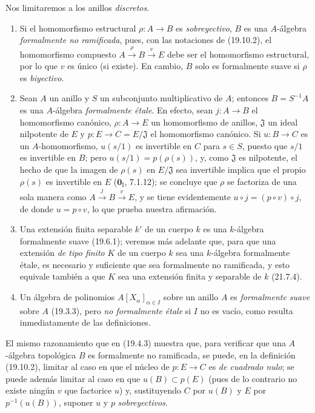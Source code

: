 
\begin{examples}[19.10.3]
\label{0.19.10.3-fr}
Nos limitaremos a los anillos \emph{discretos}.
\begin{enumerate}
  \item[(i)] Si el homomorfismo estructural $\rho:A\to B$ es
  \emph{sobreyectivo}, $B$ es una $A$-álgebra \emph{formalmente no ramificada},
  pues, con las notaciones de (19.10.2), el homomorfismo compuesto
  $A\xrightarrow{\rho}B\xrightarrow{v}E$ debe ser el homomorfismo estructural,
  por lo que $v$ es único (si existe). En cambio, $B$ solo es formalmente suave si $\rho$ es \emph{biyectivo}.
  \item[(ii)] Sean $A$ un anillo y $S$ un subconjunto multiplicativo de $A$;
  entonces $B=S^{-1}A$ es una $A$-álgebra \emph{formalmente étale}. En efecto,
  sean $j:A\to B$ el homomorfismo canónico, $\rho:A\to E$ un homomorfismo de
  anillos, $\mathfrak J$ un ideal nilpotente de $E$ y
  $p:E\to C=E/\mathfrak J$ el homomorfismo canónico. Si $u:B\to C$ es un
  $A$-homomorfismo, $u(s/1)$ es invertible en $C$ para $s\in S$, puesto que
  $s/1$ es invertible en $B$; pero $u(s/1)=p(\rho(s))$, y, como $\mathfrak J$
  es nilpotente, el hecho de que la imagen de $\rho(s)$ en $E/\mathfrak J$ sea
  invertible implica que el propio $\rho(s)$ es invertible en $E$
  ($\mathbf 0_{\mathrm I}$, 7.1.12); se concluye que $\rho$ se factoriza de una
  sola manera como $A\xrightarrow{j}B\xrightarrow{v}E$, y se tiene
  evidentemente $u\circ j=(p\circ v)\circ j$, de donde $u=p\circ v$, lo que
  prueba nuestra afirmación.
  \item[(iii)] Una extensión finita separable $k'$ de un cuerpo $k$ es una
  $k$-álgebra formalmente suave (19.6.1); veremos más adelante que, para que una
  extensión \emph{de tipo finito} $K$ de un cuerpo $k$ sea una $k$-álgebra
  formalmente étale, es necesario y suficiente que sea formalmente no
  ramificada, y esto equivale también a que $K$ sea una extensión finita y
  separable de $k$ (21.7.4).
  \item[(iv)] Un álgebra de polinomios $A[X_\alpha]_{\alpha\in I}$ sobre un
  anillo $A$ es \emph{formalmente suave} sobre $A$ (19.3.3), pero \emph{no
  formalmente étale} si $I$ no es vacío, como resulta inmediatamente de las
  definiciones.
\end{enumerate}
\end{examples}

\begin{remark}[19.10.4]
\label{0.19.10.4-fr}
El mismo razonamiento que en (19.4.3) muestra que, para verificar que una
$A$-álgebra topológica $B$ es formalmente no ramificada, se puede, en la
definición (19.10.2), limitar al caso en que el núcleo de $p:E\to C$ es
\emph{de cuadrado nulo}; se puede además limitar al caso en que $u(B)\subset p(E)$
(pues de lo contrario no existe ningún $v$ que factorice $u$) y, sustituyendo
$C$ por $u(B)$ y $E$ por $p^{-1}(u(B))$, suponer $u$ y $p$ \emph{sobreyectivos}.
\end{remark}
